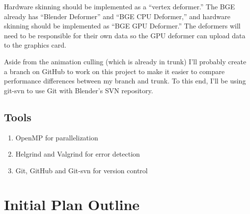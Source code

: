 \documentclass[10pt]{article}
\begin{document}
Hardware skinning should be implemented as a ``vertex deformer.'' The BGE already has ``Blender Deformer'' and ``BGE CPU Deformer,'' and hardware skinning should be implemented as ``BGE GPU Deformer.'' The deformers will need to be responsible for their own data so the GPU deformer can upload data to the graphics card.

Aside from the animation culling (which is already in trunk) I'll probably create a branch on GitHub to work on this project to make it easier to compare performance differences between my branch and trunk. To this end, I'll be using git-svn to use Git with Blender's SVN repository.

\subsection{Tools}
\begin{enumerate}
 \item OpenMP\cite{openmp} for parallelization
 \item Helgrind and Valgrind for error detection
 \item Git, GitHub\cite{github} and Git-svn for version control
\end{enumerate}

\section{Initial Plan Outline}
\end{document}
